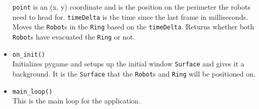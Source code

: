 \documentclass[12pt,letterpaper]{article}
\newcommand{\tableheader}{\rowfont\bf\rowcolor{thcolor!30}}
\begin{document}
\begin{itemize}
                \texttt{point} is an (x, y) coordinate and is the position on the perimeter the robots need to head for. \texttt{timeDelta} is the time since the last frame in milliseconds. Moves the \texttt{Robot}s in the \texttt{Ring} based on the \texttt{timeDelta}. Returns whether both \texttt{Robot}s have evacuated the \texttt{Ring} or not.
            \item \texttt{on\_init()} \\
                Initializes pygame and setups up the initial window \texttt{Surface} and gives it a background. It is the \texttt{Surface} that the \texttt{Robot}s and \texttt{Ring} will be positioned on.
            \item \texttt{main\_loop()} \\
                This is the main loop for the application.
        \end{itemize}

        
\end{document}

